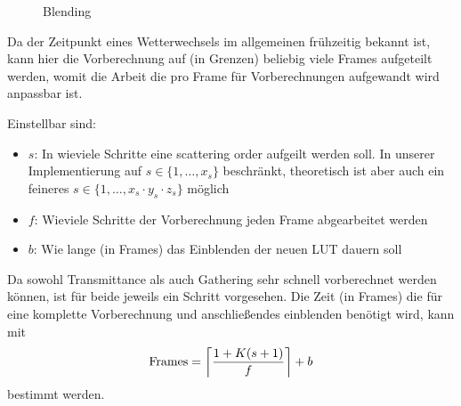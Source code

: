 \begin{figure}[H]
	\centering
	\caption{Blending}
	\label{blending}
\end{figure}
Da der Zeitpunkt eines Wetterwechsels im allgemeinen frühzeitig bekannt ist, kann hier die Vorberechnung auf (in
Grenzen) beliebig viele Frames aufgeteilt werden, womit die Arbeit die pro Frame für Vorberechnungen aufgewandt wird
anpassbar ist.

Einstellbar sind:
\begin{itemize}
	\item $s$: In wieviele Schritte eine scattering order aufgeilt werden soll. In unserer Implementierung auf
	$s \in \{1, \dots, x_s\}$ beschränkt, theoretisch ist aber auch ein feineres $s \in \{1,\dots,x_s \cdot y_s \cdot
	z_s\}$ möglich
	\item $f$: Wieviele Schritte der Vorberechnung jeden Frame abgearbeitet werden
	\item $b$: Wie lange (in Frames) das Einblenden der neuen LUT dauern soll
\end{itemize}
Da sowohl Transmittance als auch Gathering sehr schnell vorberechnet werden können, ist für beide jeweils ein Schritt
vorgesehen. Die Zeit (in Frames) die für eine komplette Vorberechnung und anschließendes einblenden benötigt wird, kann
mit
\begin{equation}
	\text{Frames} = \ceil*{\frac{1+K (s+1)}{f}} + b
\end{equation}
bestimmt werden.

